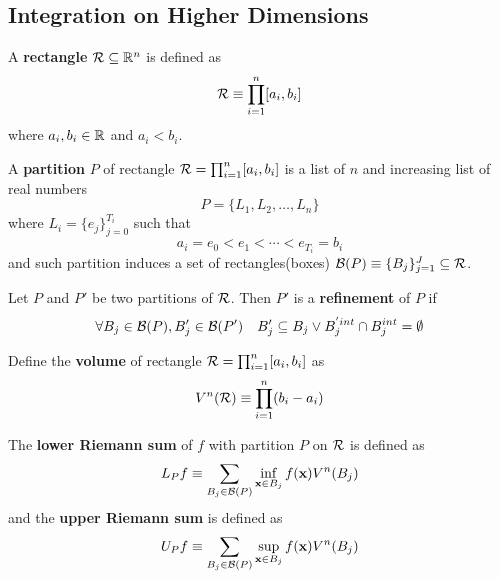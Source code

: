 \documentclass[11pt]{article}
\begin{document}
		\subsection{Integration on Higher Dimensions}
			\begin{definition}
				A \textbf{rectangle} $\mathcal{{R}} \subseteq \mathbb{R}^n$ is defined as
				\begin{equation}
					\mathcal{{R}} \equiv \prod_{i=1}^n [a_i, b_i]
				\end{equation}
				where $a_i, b_i \in \mathbb{R}$ and $a_i < b_i$.
			\end{definition}
			
			\begin{definition}
				A \textbf{partition} $P$ of rectangle $\mathcal{{R}} = \prod_{i=1}^n [a_i, b_i]$ is a list of $n$  and increasing list of real numbers
				\begin{equation}
					P = \{L_1, L_2, \dots, L_n\}
				\end{equation}
				where $L_i = \{e_j\}_{j=0}^{T_i}$ such that
				\begin{equation}
					a_i = e_0 < e_1 < \cdots < e_{T_i} = b_i
				\end{equation}
				and such partition induces a set of rectangles(boxes) $\mathcal{{B}}(P) \equiv \{B_j\}_{j=1}^J \subseteq \mathcal{{R}}$.
			\end{definition}
			
			\begin{definition}
				Let $P$ and $P'$ be two partitions of $\mathcal{{R}}$. Then $P'$ is a \textbf{refinement} of $P$ if 
				\begin{equation}
					\forall B_j \in \mathcal{{B}}(P), B_j' \in \mathcal{{B}}(P')\quad B_j' \subseteq B_j \lor B_j^{' int} \cap B_j^{int} = \emptyset
				\end{equation}
			\end{definition}
			
			\begin{definition}
				Define the \textbf{volume} of rectangle $\mathcal{{R}} = \prod_{i=1}^n [a_i, b_i]$ as
				\begin{equation}
					V^n(\mathcal{{R}}) \equiv \prod_{i=1}^n (b_i - a_i)
				\end{equation}
			\end{definition}
			
			\begin{definition}
				The \textbf{lower Riemann sum} of $f$ with partition $P$ on $\mathcal{{R}}$ is defined as
				\begin{equation}
					L_P f \equiv \sum_{B_j \in \mathcal{{B}}(P)} \inf_{\textbf{x} \in B_j} f(\textbf{x}) V^n(B_j)
				\end{equation}
				and the \textbf{upper Riemann sum} is defined as
				\begin{equation}
					U_P f \equiv \sum_{B_j \in \mathcal{{B}}(P)} \sup_{\textbf{x} \in B_j} f(\textbf{x}) V^n(B_j)
				\end{equation}
			\end{definition}
			
\end{document}
